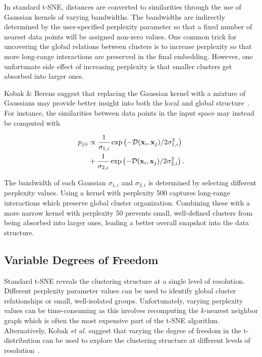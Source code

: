 \documentclass[letter]{article}
\begin{document}
In standard t-SNE, distances are converted to similarities through the use of
Gaussian kernels of varying bandwidths. The bandwidths are indirectly determined
by the user-specified perplexity parameter so that a fixed number of nearest
data points will be assigned non-zero values. One common trick for uncovering
the global relations between clusters is to increase perplexity so that more
long-range interactions are preserved in the final embedding.  However, one
unfortunate side effect of increasing perplexity is that smaller clusters get
absorbed into larger ones.

Kobak \& Berens suggest that replacing the Gaussian kernel with a mixture of
Gaussians may provide better insight into both the local and global
structure~\cite{kobak2019art}. For instance, the similarities between data
points in the input space may instead be computed with

\begin{align}
  p_{j\mid i} &\propto \frac{1}{\sigma_{1,i}} \exp \left ( -\mathcal{D}(\mathbf{x}_i, \mathbf{x}_j ) / 2\sigma_{1,i}^2 \right ) \notag \\
  &+ \frac{1}{\sigma_{2,i}} \exp \left ( -\mathcal{D}(\mathbf{x}_i, \mathbf{x}_j ) / 2\sigma_{2,i}^2 \right ).
\end{align}

The bandwidth of each Gaussian $\sigma_{1,i}$ and $\sigma_{2,i}$ is determined
by selecting different perplexity values. Using a kernel with perplexity 500
captures long-range interactions which preserve global cluster organization.
Combining these with a more narrow kernel with perplexity 50 prevents small,
well-defined clusters from being absorbed into larger ones, leading a better
overall snapshot into the data structure.

\subsection*{Variable Degrees of Freedom}

Standard t-SNE reveals the clustering structure at a single level of resolution.
Different perplexity parameter values can be used to identify global cluster
relationships or small, well-isolated groups. Unfortunately, varying perplexity
values can be time-consuming as this involves recomputing the $k$-nearest
neighbor graph which is often the most expensive part of the t-SNE algorithm.
Alternatively, Kobak \textit{et al.} suggest that varying the degree of freedom
in the t-distribution can be used to explore the clustering structure at
different levels of resolution~\cite{kobak2019heavy}. 
\end{document}
